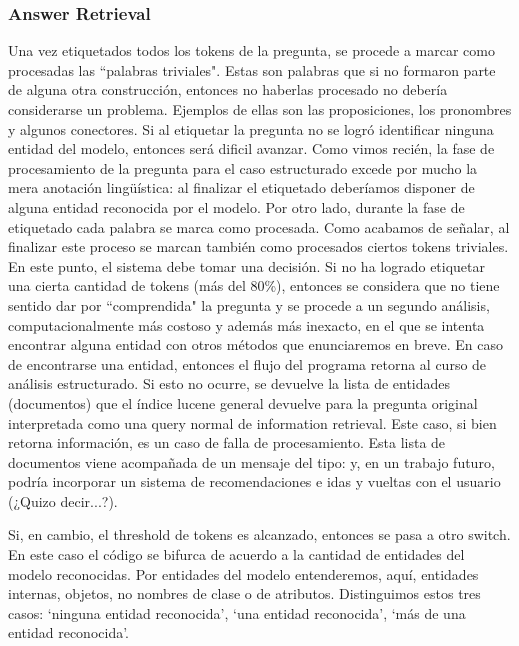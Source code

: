 \subsubsection{Answer Retrieval}

Una vez etiquetados todos los tokens de la pregunta, se procede a marcar como procesadas las ``palabras triviales". Estas son palabras que si no formaron parte de alguna otra construcción, entonces no haberlas procesado no debería considerarse un problema. Ejemplos de ellas son las proposiciones, los pronombres y algunos conectores. Si al etiquetar la pregunta no se logró identificar ninguna entidad del modelo, entonces será dificil avanzar. Como vimos recién, la fase de procesamiento de la pregunta para el caso estructurado excede por mucho la mera anotación lingüística: al finalizar el etiquetado deberíamos disponer de alguna entidad reconocida por el modelo. Por otro lado, durante la fase de etiquetado cada palabra se marca como procesada. Como acabamos de señalar, al finalizar este proceso se marcan también como procesados ciertos tokens triviales. En este punto, el sistema debe tomar una decisión. Si no ha logrado etiquetar una cierta cantidad de tokens (más del 80\%), entonces se considera que no tiene sentido dar por ``comprendida" la pregunta y se procede a un segundo análisis, computacionalmente más costoso y además más inexacto, en el que se intenta encontrar alguna entidad con otros métodos que enunciaremos en breve. En caso de encontrarse una entidad, entonces el flujo del programa retorna al curso de análisis estructurado. Si esto no ocurre, se devuelve la lista de entidades (documentos) que el índice lucene general devuelve para la pregunta original interpretada como una query normal de information retrieval. Este caso, si bien retorna información, es un caso de falla de procesamiento. Esta lista de documentos viene acompañada de un mensaje del tipo:  y, en un trabajo futuro, podría incorporar un sistema de recomendaciones e idas y vueltas con el usuario (¿Quizo decir...?).

Si, en cambio, el threshold de tokens es alcanzado, entonces se pasa a otro switch. En este caso el código se bifurca de acuerdo a la cantidad de entidades del modelo reconocidas. Por entidades del modelo entenderemos, aquí, entidades internas, objetos, no nombres de clase o de atributos. Distinguimos estos tres casos: `ninguna entidad reconocida', `una entidad reconocida', `más de una entidad reconocida'.



